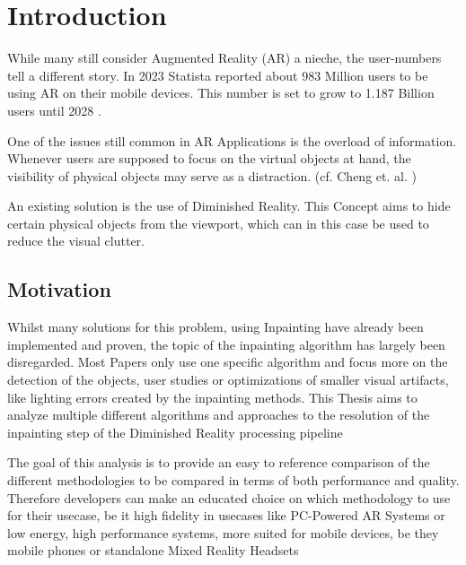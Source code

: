 \chapter{Introduction}
\label{cha:Introduction}

While many still consider Augmented Reality (AR) a nieche, the user-numbers tell a different story. In 2023 Statista reported about 983 Million users to be using AR on their mobile devices. This number is set to grow to 1.187 Billion users until 2028 \cite{Statista2024}.

One of the issues still common in AR Applications is the overload of information. Whenever users are supposed to focus on the virtual objects at hand, the visibility of physical objects may serve as a distraction. (cf. Cheng et. al. \cite{ChengYiFei2022TUDR})

An existing solution is the use of Diminished Reality. This Concept aims to hide certain physical objects from the viewport, which can in this case be used to reduce the visual clutter.

\section{Motivation}

Whilst many solutions for this problem, using Inpainting have already been implemented and proven, the topic of the inpainting algorithm has largely been disregarded. Most Papers only use one specific algorithm and focus more on the detection of the objects, user studies or optimizations of smaller visual artifacts, like lighting errors created by the inpainting methods. This Thesis aims to analyze multiple different algorithms and approaches to the resolution of the inpainting step of the Diminished Reality processing pipeline

The goal of this analysis is to provide an easy to reference comparison of the different methodologies to be compared in terms of both performance and quality. Therefore developers can make an educated choice on which methodology to use for their usecase, be it high fidelity in usecases like PC-Powered AR Systems or low energy, high performance systems, more suited for mobile devices, be they mobile phones or standalone Mixed Reality Headsets